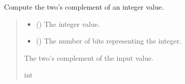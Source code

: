 \documentclass[letterpaper,10pt,english]{sphinxmanual}
\begin{document}
\begin{fulllineitems}
\label{\detokenize{apidocs:backplane.twos_comp}}
\pysigstartsignatures
{}
\pysigstopsignatures
\sphinxAtStartPar
Compute the two’s complement of an integer value.
\begin{quote}\begin{description}
\begin{itemize}
\item {} 
\sphinxAtStartPar
{} () \textendash{} The integer value.

\item {} 
\sphinxAtStartPar
{} () \textendash{} The number of bits representing the integer.

\end{itemize}

\sphinxAtStartPar
The two’s complement of the input value.

\sphinxAtStartPar
int

\end{description}\end{quote}

\end{fulllineitems}

\label{\detokenize{apidocs:module-management}}
\end{document}
